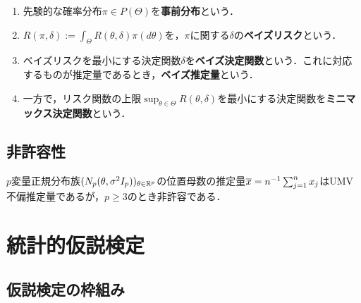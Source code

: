 \documentclass[uplatex,dvipdfmx]{jsreport}
\begin{document}
\begin{definition}\mbox{}
    \begin{enumerate}
        \item 先験的な確率分布$\pi\in P(\Theta)$を\textbf{事前分布}という．
        \item $R(\pi,\delta):=\int_\Theta R(\theta,\delta)\pi(d\theta)$を，$\pi$に関する$\delta$の\textbf{ベイズリスク}という．
        \item ベイズリスクを最小にする決定関数$\delta$を\textbf{ベイズ決定関数}という．これに対応するものが推定量であるとき，\textbf{ベイズ推定量}という．
        \item 一方で，リスク関数の上限$\sup_{\theta\in\Theta}R(\theta,\delta)$を最小にする決定関数を\textbf{ミニマックス決定関数}という．
    \end{enumerate}
\end{definition}

\subsection{非許容性}

\begin{tcolorbox}[colframe=ForestGreen, colback=ForestGreen!10!white,breakable,colbacktitle=ForestGreen!40!white,coltitle=black,fonttitle=\bfseries\sffamily,
title=]
    $p$変量正規分布族$(N_p(\theta,\sigma^2I_p))_{\theta\in\mathbb{R}^p}$の位置母数の推定量$\overline{x}=n^{-1}\sum^n_{j=1}x_j$はUMV不偏推定量であるが，$p\ge3$のとき非許容である．
\end{tcolorbox}

\section{統計的仮説検定}

\subsection{仮説検定の枠組み}
\end{document}
